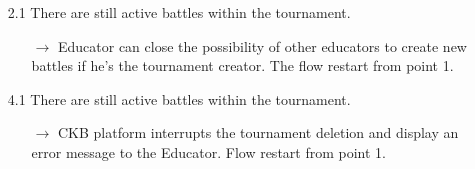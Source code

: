 \documentclass{article}
\begin{document}
{\begin{enumerate}
\begin{xltabular}{\textwidth}
\begin{itemize}
                                                    \item[2.1] There are still active battles within the tournament. 
                                                    \begin{itemize}
                                                        \item[$\rightarrow$] Educator can close the possibility of 
                                                        other educators to create new battles if he's the tournament
                                                        creator. The flow restart from point 1.
                                                    \end{itemize} 
                                                    \item[4.1] There are still active battles within the tournament.
                                                    \begin{itemize}
                                                        \item[$\rightarrow$] CKB platform interrupts the tournament
                                                        deletion and display an error message to the Educator. Flow
                                                        restart from point 1.
                                                    \end{itemize} 
                                                \end{itemize}
                    \end{xltabular}
                    

\end{enumerate}}
\end{document}
